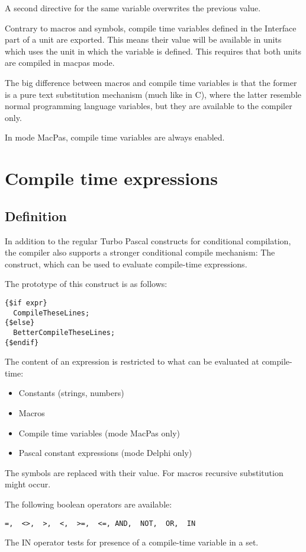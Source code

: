 A second  directive for the same variable overwrites the previous value.

Contrary to macros and symbols, compile time variables defined in the 
Interface part of a unit are exported. This means their value will be 
available in units which uses the unit in which the variable is defined. 
This requires that both units are compiled in macpas mode.

The big difference between macros and compile time variables is that the
former is a pure text substitution mechanism (much like in C), where the
latter resemble normal programming language variables, but they are
available to the compiler only. 

In mode MacPas, compile time variables are always enabled.

\section{Compile time expressions}
\subsection{Definition}
\label{se:compileexpressions}
In addition to the regular Turbo Pascal constructs for conditional compilation,
the \fpc compiler also supports a stronger conditional compile mechanism: 
The  construct, which can be used to evaluate compile-time
expressions.


The prototype of this construct is as follows:
\begin{verbatim}
{$if expr}
  CompileTheseLines;
{$else}
  BetterCompileTheseLines;
{$endif}
\end{verbatim}

The content of an expression is restricted to what can be evaluated at
compile-time:
\begin{itemize}
\item Constants (strings, numbers)
\item Macros
\item Compile time variables (mode MacPas only)
\item Pascal constant expressions (mode Delphi only)
\end{itemize}
The symbols are replaced with their value. For macros recursive substitution
might occur.

The following boolean operators are available:
\begin{verbatim}
=,  <>,  >,  <,  >=,  <=, AND,  NOT,  OR,  IN 
\end{verbatim}
The IN operator tests for presence of a compile-time variable in a set.

